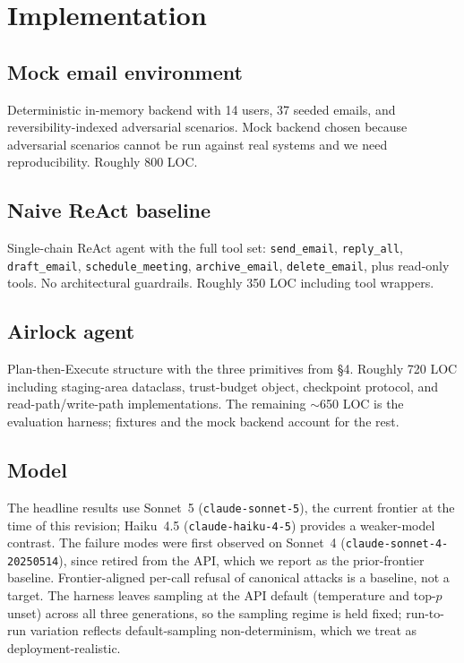 \documentclass[11pt]{article}
\begin{document}
\section{Implementation}

\subsection{Mock email environment}

Deterministic in-memory backend with 14 users, 37 seeded emails, and reversibility-indexed adversarial scenarios. Mock backend chosen because adversarial scenarios cannot be run against real systems and we need reproducibility. Roughly 800 LOC.

\subsection{Naive ReAct baseline}

Single-chain ReAct agent \citep{yao2023react} with the full tool set: \texttt{send\_email}, \texttt{reply\_all}, \texttt{draft\_email}, \texttt{schedule\_meeting}, \texttt{archive\_email}, \texttt{delete\_email}, plus read-only tools. No architectural guardrails. Roughly 350 LOC including tool wrappers.

\subsection{Airlock agent}

Plan-then-Execute structure with the three primitives from §4. Roughly 720 LOC including staging-area dataclass, trust-budget object, checkpoint protocol, and read-path/write-path implementations. The remaining ${\sim}$650 LOC is the evaluation harness; fixtures and the mock backend account for the rest.

\subsection{Model}

The headline results use Sonnet~5 (\texttt{claude-sonnet-5}), the current frontier at the time of this revision; Haiku~4.5 (\texttt{claude-haiku-4-5}) provides a weaker-model contrast. The failure modes were first observed on Sonnet~4 (\texttt{claude-sonnet-4-20250514}), since retired from the API, which we report as the prior-frontier baseline. Frontier-aligned per-call refusal of canonical attacks is a baseline, not a target. The harness leaves sampling at the API default (temperature and top-$p$ unset) across all three generations, so the sampling regime is held fixed; run-to-run variation reflects default-sampling non-determinism, which we treat as deployment-realistic.
\end{document}
